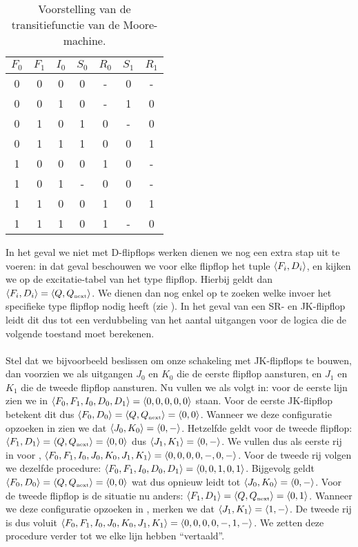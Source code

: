 \begin{table}[hbt]
{\begin{tabular}{ccc|cccc}
$F_0$&$F_1$&$I_0$&$S_0$&$R_0$&$S_1$&$R_1$\\\hline
0&0&0&0&-&0&-\\
0&0&1&0&-&1&0\\
0&1&0&1&0&-&0\\
0&1&1&1&0&0&1\\
1&0&0&0&1&0&-\\
1&0&1&-&0&0&-\\
1&1&0&0&1&0&1\\
1&1&1&0&1&-&0
\end{tabular}
}
\caption{Voorstelling van de transitiefunctie van de Moore-machine.}
\end{table}

In het geval we niet met D-flipflops werken dienen we nog een extra stap uit te voeren: in dat geval beschouwen we voor elke flipflop het tuple $\left\langle F_i,D_i \right\rangle$, en kijken we op de excitatie-tabel van het type flipflop. Hierbij geldt dan $\left\langle F_i,D_i \right\rangle=\left\langle Q,Q_{\mbox{\tiny{next}}}{} \right\rangle$. We dienen dan nog enkel op te zoeken welke invoer het specifieke type flipflop nodig heeft (zie ). In het geval van een SR- en JK-flipflop leidt dit dus tot een verdubbeling van het aantal uitgangen voor de logica die de volgende toestand moet berekenen.

\paragraph{}
Stel dat we bijvoorbeeld beslissen om onze schakeling met JK-flipflops te bouwen, dan voorzien we als uitgangen $J_0$ en $K_0$ die de eerste flipflop aansturen, en $J_1$ en $K_1$ die de tweede flipflop aansturen. Nu vullen we  als volgt in: voor de eerste lijn zien we in  $\left\langle F_0,F_1,I_0,D_0,D_1 \right\rangle=\left\langle 0,0,0,0,0 \right\rangle$ staan. Voor de eerste JK-flipflop betekent dit dus $\left\langle F_0,D_0 \right\rangle=\left\langle Q,Q_{\mbox{\tiny{next}}}{} \right\rangle=\left\langle 0,0 \right\rangle$. Wanneer we deze configuratie opzoeken in  zien we dat $\left\langle J_0,K_0 \right\rangle=\left\langle 0,- \right\rangle$. Hetzelfde geldt voor de tweede flipflop: $\left\langle F_1,D_1 \right\rangle=\left\langle Q,Q_{\mbox{\tiny{next}}}{} \right\rangle=\left\langle 0,0 \right\rangle$ dus $\left\langle J_1,K_1 \right\rangle=\left\langle 0,- \right\rangle$. We vullen dus als eerste rij in voor , $\left\langle F_0,F_1,I_0,J_0,K_0,J_1,K_1 \right\rangle=\left\langle 0,0,0,0,-,0,- \right\rangle$. Voor de tweede rij volgen we dezelfde procedure: $\left\langle F_0,F_1,I_0,D_0,D_1 \right\rangle=\left\langle 0,0,1,0,1 \right\rangle$. Bijgevolg geldt $\left\langle F_0,D_0 \right\rangle=\left\langle Q,Q_{\mbox{\tiny{next}}}{} \right\rangle=\left\langle 0,0 \right\rangle$ wat dus opnieuw leidt tot $\left\langle J_0,K_0 \right\rangle=\left\langle 0,- \right\rangle$. Voor de tweede flipflop is de situatie nu anders: $\left\langle F_1,D_1 \right\rangle=\left\langle Q,Q_{\mbox{\tiny{next}}}{} \right\rangle=\left\langle 0,1 \right\rangle$. Wanneer we deze configuratie opzoeken in , merken we dat $\left\langle J_1,K_1 \right\rangle=\left\langle 1,- \right\rangle$. De tweede rij is dus voluit $\left\langle F_0,F_1,I_0,J_0,K_0,J_1,K_1 \right\rangle=\left\langle 0,0,0,0,-,1,- \right\rangle$. We zetten deze procedure verder tot we elke lijn hebben ``vertaald''.

